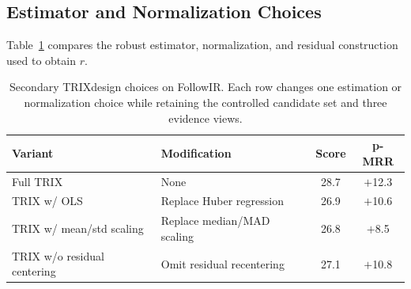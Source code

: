 \documentclass[letterpaper]{article}
\newcommand{\method}{\ifmmode \mathrm{TRIX}\else TRIX\xspace\fi}
\begin{document}
\subsection{Estimator and Normalization Choices}

Table~\ref{tab:diagnostic-ablation} compares the robust estimator,
normalization, and residual construction used to obtain $r$.

\begin{table}[t]
\centering
\small
\setlength{\tabcolsep}{2.2pt}
\begin{tabular}{p{0.92in}p{1.30in}cc}
\toprule
\textbf{Variant} & \textbf{Modification} & \textbf{Score} & \textbf{p-MRR} \\
\midrule
Full \method{} & None & 28.7 & $+$12.3 \\
\method{} w/ OLS & Replace Huber regression & 26.9 & $+$10.6 \\
\method{} w/ mean/std scaling & Replace median/MAD scaling & 26.8 & $+$8.5 \\
\method{} w/o residual centering & Omit residual recentering & 27.1 & $+$10.8 \\
\bottomrule
\end{tabular}
\caption{Secondary \method design choices on FollowIR.  Each row changes one
estimation or normalization choice while retaining the controlled candidate
set and three evidence views.}
\label{tab:diagnostic-ablation}
\end{table}
\end{document}
